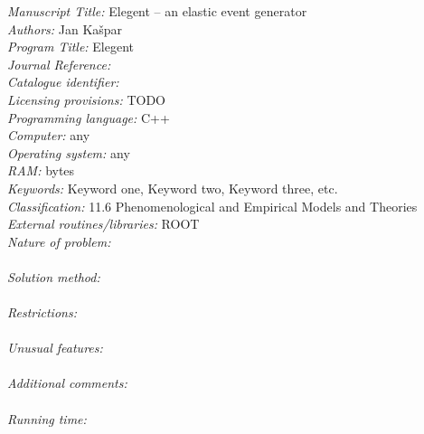 \documentclass[preprint,12pt]{elsarticle}
\begin{document}
\begin{small}
\noindent
{\em Manuscript Title:} Elegent -- an elastic event generator\\
{\em Authors:} Jan Ka\v spar\\
{\em Program Title:} Elegent\\
{\em Journal Reference:}\\ %
{\em Catalogue identifier:}\\ %
{\em Licensing provisions:} TODO\\ %
{\em Programming language:} C++\\
{\em Computer:} any\\
{\em Operating system:} any\\
{\em RAM:} bytes\\
{\em Keywords:} Keyword one, Keyword two, Keyword three, etc.\\ %
{\em Classification:} 11.6 Phenomenological and Empirical Models and Theories\\ %
{\em External routines/libraries:} ROOT\\
{\em Nature of problem:}\\
\\
{\em Solution method:}\\
\\
{\em Restrictions:}\\
\\
{\em Unusual features:}\\
\\
{\em Additional comments:}\\
\\
{\em Running time:}\\
\\

\end{small}
\end{document}
